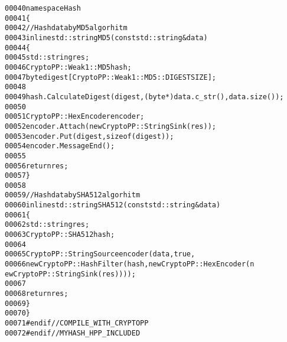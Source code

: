 \begin{footnotesize}
\begin{alltt}
00040 \textcolor{comment}{}\textcolor{keyword}{namespace }Hash
00041 \{
00042         \textcolor{comment}{//Hash data by MD5 algorhitm}
00043         \textcolor{keyword}{inline} std::string MD5(\textcolor{keyword}{const} std::string &data)
00044         \{
00045                 std::string res;
00046                 CryptoPP::Weak1::MD5 hash;
00047                 byte digest[CryptoPP::Weak1::MD5::DIGESTSIZE];
00048 
00049                 hash.CalculateDigest(digest, (byte*)data.c\_str(), data.size());
00050 
00051                 CryptoPP::HexEncoder encoder;
00052                 encoder.Attach(\textcolor{keyword}{new} CryptoPP::StringSink(res));
00053                 encoder.Put(digest, \textcolor{keyword}{sizeof}(digest));
00054                 encoder.MessageEnd();
00055 
00056                 \textcolor{keywordflow}{return} res;
00057         \}
00058 
00059         \textcolor{comment}{//Hash data by SHA512 algorhitm}
00060         \textcolor{keyword}{inline} std::string SHA512(\textcolor{keyword}{const} std::string &data)
00061         \{
00062                 std::string res;
00063                 CryptoPP::SHA512 hash;
00064 
00065                 CryptoPP::StringSource encoder(data, \textcolor{keyword}{true},
00066                         \textcolor{keyword}{new} CryptoPP::HashFilter(hash, \textcolor{keyword}{new} CryptoPP::HexEncoder(\textcolor{keyword}{n
      ew} CryptoPP::StringSink(res))));
00067 
00068                 \textcolor{keywordflow}{return} res;
00069         \}
00070 \}
00071 \textcolor{preprocessor}{    #endif //COMPILE\_WITH\_CRYPTOPP}
00072 \textcolor{preprocessor}{}\textcolor{preprocessor}{#endif // MYHASH\_HPP\_INCLUDED}
\end{alltt}\end{footnotesize}
